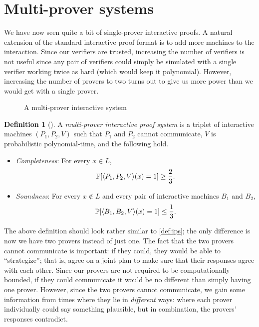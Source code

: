 \documentclass[english,12pt]{reedthesis}
\theoremstyle{plain}
\theoremstyle{definition}
\newtheorem{defn}[defn]{Definition}
\theoremstyle{remark}
\DeclarePairedDelimiter{\ang}{\langle}{\rangle}
\begin{document}
\section{Multi-prover systems}\label{sec:multi-prover}

We have now seen quite a bit of single-prover interactive proofs. A natural
extension of the standard interactive proof format is to add more machines to
the interaction. Since our verifiers are trusted, increasing the number of
verifiers is not useful since any pair of verifiers could simply be simulated
with a single verifier working twice as hard (which would keep it polynomial).
However, increasing the number of provers to two turns out to give us more power
than we would get with a single prover.

\begin{figure}[htbp]
  \centering
  \caption{A multi-prover interactive system}\label{fig:mip}
\end{figure}

\begin{defn}[{\cite[Def.\ 4.11.2]{Go01}}]\label{def:mps}
  A \emph{multi-prover interactive proof system} is a triplet of interactive
  machines $(P_{1}, P_{2}, V)$ such that $P_{1}$ and $P_{2}$ cannot communicate,
  $V$ is probabilistic polynomial-time, and the following hold.
  \begin{itemize}
    \item \emph{Completeness}: For every $x \in L$,
          \[
            \mathbb{P}[\ang{P_{1}, P_{2}, V}(x) = 1] \ge \frac{2}{3}.
          \]
    \item \emph{Soundness}: For every $x \notin L$ and every pair of interactive
          machines $B_{1}$ and $B_{2}$,
          \[
            \mathbb{P}[\ang{B_{1}, B_{2}, V}(x) = 1] \le \frac{1}{3}.
          \]
  \end{itemize}
\end{defn}

The above definition should look rather similar to \cref{def:ips}; the only
difference is now we have two provers instead of just one. The fact that the two
provers cannot communicate is important: if they could, they would be able to
``strategize''; that is, agree on a joint plan to make sure that their responses
agree with each other. Since our provers are not required to be computationally
bounded, if they could communicate it would be no different than simply having
one prover. However, since the two provers cannot communicate, we gain some
information from times where they lie in \emph{different} ways: where each
prover individually could say something plausible, but in combination, the
provers' responses contradict.
\end{document}
